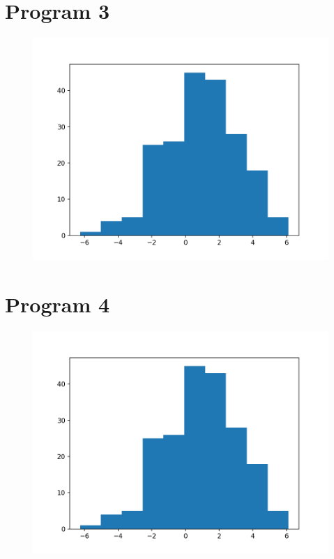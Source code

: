 \documentclass[12pt]{article}%
\theoremstyle{definition}
\begin{document}
	
	\newpage
	
	\section{Program 3}
	
	\begin{figure}[h]
	\includegraphics[scale=0.6]{program3_hist}
	\end{figure}
	
	\section{Program 4}

	\begin{figure}[h]
	\includegraphics[scale=0.6]{program4_hist}
	\end{figure}
	
\end{document}
